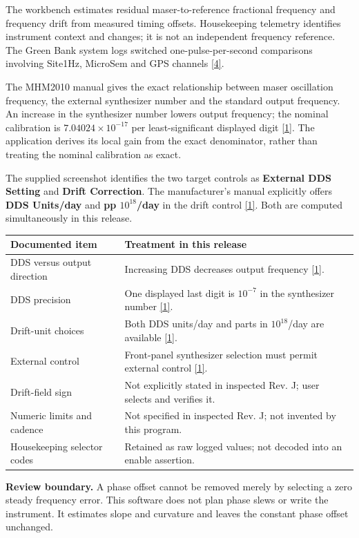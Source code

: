 \documentclass[11pt,a4paper]{article}
\newcommand{\manual}{\href{https://www.gb.nrao.edu/~fghigo/timer/MSMmaser/Maser_UG_75666-201_Rev_J.PDF}{[1]}}
\newcommand{\siteclock}{\href{https://www.gb.nrao.edu/~fghigo/timer/time_logging.html}{[4]}}
\newcommand{\warning}[1]{\par\noindent\colorbox{light}{\parbox{\dimexpr\linewidth-2\fboxsep}{\textbf{Review boundary.} #1}}\par}
\begin{document}
The workbench estimates residual maser-to-reference fractional frequency and
frequency drift from measured timing offsets. Housekeeping telemetry identifies
instrument context and changes; it is not an independent frequency reference.
The Green Bank system logs switched one-pulse-per-second comparisons involving
Site1Hz, MicroSem and GPS channels \siteclock.

The MHM2010 manual gives the exact relationship between maser oscillation
frequency, the external synthesizer number and the standard output frequency.
An increase in the synthesizer number lowers output frequency; the nominal
calibration is \(7.04024\times10^{-17}\) per least-significant displayed digit
\manual. The application derives its local gain from the exact denominator,
rather than treating the nominal calibration as exact.

The supplied screenshot identifies the two target controls as \textbf{External
DDS Setting} and \textbf{Drift Correction}. The manufacturer's manual explicitly
offers \textbf{DDS Units/day} and \textbf{pp \(10^{18}\)/day} in the drift control
\manual. Both are computed simultaneously in this release.

\begin{longtable}{@{}p{.31\linewidth}p{.64\linewidth}@{}}
\toprule
Documented item & Treatment in this release\\
\midrule
DDS versus output direction & Increasing DDS decreases output frequency \manual.\\
DDS precision & One displayed last digit is \(10^{-7}\) in the synthesizer number \manual.\\
Drift-unit choices & Both DDS units/day and parts in \(10^{18}\)/day are available \manual.\\
External control & Front-panel synthesizer selection must permit external control \manual.\\
Drift-field sign & Not explicitly stated in inspected Rev. J; user selects and verifies it.\\
Numeric limits and cadence & Not specified in inspected Rev. J; not invented by this program.\\
Housekeeping selector codes & Retained as raw logged values; not decoded into an enable assertion.\\
\bottomrule
\end{longtable}

\warning{A phase offset cannot be removed merely by selecting a zero steady
frequency error. This software does not plan phase slews or write the
instrument. It estimates slope and curvature and leaves the constant phase
offset unchanged.}
\end{document}
